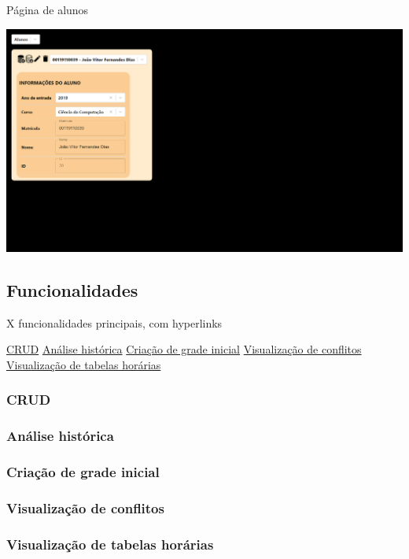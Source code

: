 \begin{MyCenteredFigure} \caption{Página de alunos} \label{fig:alunos}
  \includegraphics[width=\textwidth]{files/img/2.02!7-resultados/10-Aluno.png}
\end{MyCenteredFigure}

\subsection{Funcionalidades} \label{ssec:funcionalidades}

X funcionalidades principais, com hyperlinks

\hyperref[sssec:CRUD]{CRUD}
\hyperref[sssec:Análise histórica]{Análise histórica}
\hyperref[sssec:Criação de grade inicial]{Criação de grade inicial}
\hyperref[sssec:Visualização de conflitos]{Visualização de conflitos}
\hyperref[sssec:Visualização de tabelas horárias]{Visualização de tabelas horárias}


\subsubsection{CRUD} \label{sssec:CRUD}

\subsubsection{Análise histórica} \label{sssec:Análise histórica}

\subsubsection{Criação de grade inicial} \label{sssec:Criação de grade inicial}

\subsubsection{Visualização de conflitos} \label{sssec:Visualização de conflitos}

\subsubsection{Visualização de tabelas horárias} \label{sssec:Visualização de tabelas horárias}
